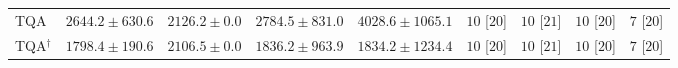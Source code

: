 \begin{tabular}{l|cccc|cccc|}
TQA & {\cellcolor[HTML]{EDE7F2}} \color[HTML]{000000} $2644.2\pm 630.6$ & {\cellcolor[HTML]{F7F0F7}} \color[HTML]{000000} $2126.2\pm 0.0$ & {\cellcolor[HTML]{E8E4F0}} \color[HTML]{000000} $2784.5\pm 831.0$ & {\cellcolor[HTML]{BDC8E1}} \color[HTML]{000000} $4028.6\pm 1065.1$ & {\cellcolor[HTML]{49006A}} \color[HTML]{F1F1F1} $10$ [$20$] & {\cellcolor[HTML]{49006A}} \color[HTML]{F1F1F1} $10$ [$21$] & {\cellcolor[HTML]{49006A}} \color[HTML]{F1F1F1} $10$ [$20$] & {\cellcolor[HTML]{FFF7F3}} \color[HTML]{000000} $7$ [$20$] \\
TQA$^\dagger$ & {\cellcolor[HTML]{FEF6FA}} \color[HTML]{000000} $1798.4\pm 190.6$ & {\cellcolor[HTML]{F7F0F7}} \color[HTML]{000000} $2106.5\pm 0.0$ & {\cellcolor[HTML]{FDF5FA}} \color[HTML]{000000} $1836.2\pm 963.9$ & {\cellcolor[HTML]{FDF5FA}} \color[HTML]{000000} $1834.2\pm 1234.4$ & {\cellcolor[HTML]{49006A}} \color[HTML]{F1F1F1} $10$ [$20$] & {\cellcolor[HTML]{49006A}} \color[HTML]{F1F1F1} $10$ [$21$] & {\cellcolor[HTML]{49006A}} \color[HTML]{F1F1F1} $10$ [$20$] & {\cellcolor[HTML]{FFF7F3}} \color[HTML]{000000} $7$ [$20$] \\
\cline{1-9}
\bottomrule
\end{tabular}
